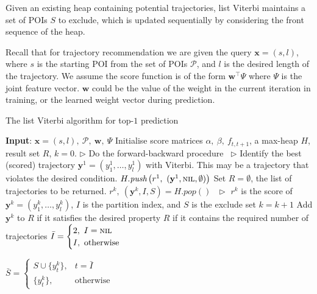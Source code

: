 Given an existing heap containing potential trajectories,
list Viterbi maintains a set of POIs $S$ to exclude, which is updated
sequentially by considering the front sequence of the heap.

Recall that for trajectory recommendation we are given the query $\mathbf{x}=(s, l)$, where
$s$ is the starting POI from the set of POIs $\mathcal{P}$,
and $l$ is the desired length of the trajectory.
We assume the score function is of the form $\mathbf{w}^\top \Psi$ where $\Psi$ is the joint
feature vector. $\mathbf{w}$ could be the value of the weight in the current iteration in training,
or the learned weight vector during prediction.

\begin{algorithm}[htbp]
\caption{The list Viterbi algorithm for top-$1$ prediction~\cite{nilsson2001sequentially,seshadri1994list}}
\label{alg:listviterbi}
\begin{algorithmic}[1]
\STATE \textbf{Input}: $\mathbf{x}=(s, l),~ \mathcal{P},~ \mathbf{w},~ \Psi$
\STATE Initialise score matrices $\alpha,~ \beta,~ f_{t, t+1}$, a max-heap $H$, result set $R$, $k=0$.
\STATE $\triangleright$ Do the forward-backward procedure~\cite{rabiner1989tutorial}
\STATE $\triangleright$ Identify the best (scored) trajectory $\mathbf{y}^1=(y_1^1,\dots,y_l^1)$
  with Viterbi. This may be a trajectory that violates the desired condition.
\STATE $H.\textit{push}\left(r^1,~ (\mathbf{y}^1, \textsc{nil}, \emptyset) \right)$
\STATE Set $R=\emptyset$, the list of trajectories to be returned.
    \STATE $r^k,~ (\mathbf{y}^k, I, S) = H.\textit{pop}()~~~ \triangleright$
           $r^k$ is the score of $\mathbf{y}^k=(y_1^k,\dots,y_l^k)$, $I$ is the partition index, and $S$ is the exclude set
    \STATE $k = k + 1$
    \STATE Add $\mathbf{y}^k$ to $R$ if it satisfies the desired property
    \RETURN $R$ if it contains the required number of trajectories
    \STATE $\bar{I} = \begin{cases}
                      2,~ I = \textsc{nil} \\
                      I,~ \text{otherwise}
                      \end{cases}$

        \STATE $\bar{S} = \begin{cases}
                          S \cup \{ y_t^k \},& t = \bar{I} \\
                          \{ y_t^k \},& \text{otherwise}
                          \end{cases}$


\end{algorithmic}
\end{algorithm}
